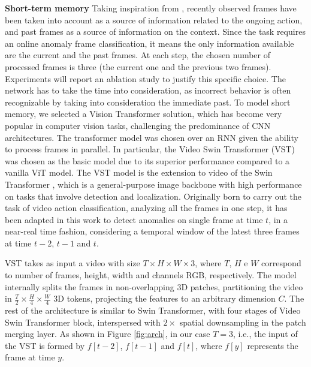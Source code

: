 \noindent\textbf{Short-term memory}
Taking inspiration from \cite{xu2021long}, recently observed frames have been taken into account as a source of information related to the ongoing action, and past frames as a source of information on the context.
Since the task requires an online anomaly frame classification, it means the only information available are the current and the past frames.
At each step, the chosen number of processed frames is three (the current one and the previous two frames).
Experiments will report an ablation study to justify this specific choice.
The network has to take the time into consideration, as incorrect behavior is often recognizable by taking into consideration the immediate past.
To model short memory, we selected a Vision Transformer \cite{DBLP:conf/iclr/DosovitskiyB0WZ21} solution, which has become very popular in computer vision tasks, challenging the predominance of CNN architectures.
The transformer model was chosen over an RNN given the ability to process frames in parallel.
In particular, the Video Swin Transformer (VST) \cite{liu_video_2022} was chosen as the basic model due to its superior performance compared to a vanilla ViT \cite{DBLP:conf/iclr/DosovitskiyB0WZ21} model.
The VST model is the extension to video of the Swin Transformer \cite{liu2021Swin}, which is a general-purpose image backbone with high performance on tasks that involve detection and localization.
Originally born to carry out the task of video action classification, analyzing all the frames in one step, it has been adapted in this work to detect anomalies on single frame at time $t$, in a near-real time fashion, considering a temporal window of the latest three frames at time $t-2$, $t-1$ and $t$.

VST takes as input a video with size $T \times H \times W \times 3$, where $T$, $H$ e $W$ correspond to number of frames, height, width and channels RGB, respectively.
The model internally splits the frames in non-overlapping 3D patches, partitioning the video in $\frac{T}{2} \times \frac{H}{4} \times \frac{W}{4}$ 3D tokens, projecting the features to an arbitrary dimension $C$.
The rest of the architecture is similar to Swin Transformer, with four stages of Video Swin Transformer block, interspersed with $2\times$ spatial downsampling in the patch merging layer.
As shown in Figure \ref{fig:arch}, in our case $T=3$, i.e., the input of the VST is formed by $f[t-2]$, $f[t-1]$ and $f[t]$, where $f[y]$ represents the frame at time $y$.

